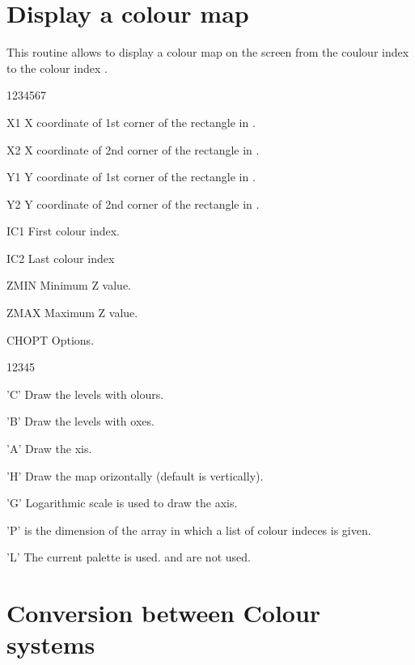 \section{Display a colour map}
\Action
This routine allows to display a colour map on the screen from the
coulour index  to the colour index .
\Pdesc
\begin{DLtt}{1234567}
\item[X1] X coordinate of 1st corner of the rectangle in \WC.
\item[X2] X coordinate of 2nd corner of the rectangle in \WC.
\item[Y1] Y coordinate of 1st corner of the rectangle in \WC.
\item[Y2] Y coordinate of 2nd corner of the rectangle in \WC.
\item[IC1] First colour index.
\item[IC2] Last colour index
\item[ZMIN] Minimum Z value.
\item[ZMAX] Maximum Z value.
\item[CHOPT] Options.
\begin{DLtt}{12345}
\item['C'] Draw the levels with olours.
\item['B'] Draw the levels with oxes.
\item['A'] Draw the xis.
\item['H'] Draw the map orizontally (default is vertically).
\item['G'] Logarithmic scale is used to draw the axis.
\item['P']  is the dimension of the  array
            in which a list of colour indeces is given.
\item['L'] The current palette is used.  and  are
           not used.
\end{DLtt}
\end{DLtt}

\newpage

\section{Conversion between Colour systems}

